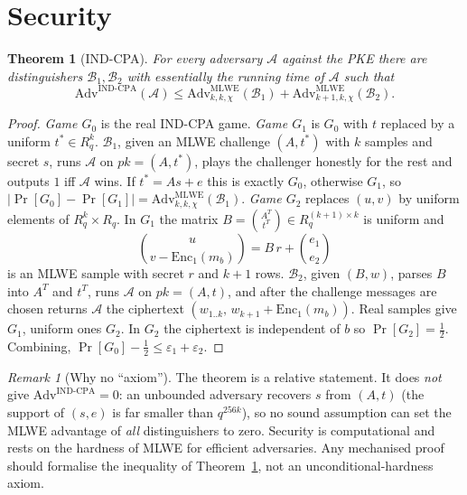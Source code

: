 \documentclass[11pt]{article}
\newtheorem{theorem}{Theorem}
\theoremstyle{remark}
\newtheorem{remark}{Remark}
\newcommand{\Rq}{R_q}
\begin{document}
\section{Security}\label{sec:sec}
\begin{theorem}[IND-CPA]\label{thm:cpa}
For every adversary $\mathcal A$ against the PKE there are distinguishers $\mathcal B_1,\mathcal B_2$ with essentially the running time of $\mathcal A$ such that
\[
\mathrm{Adv}^{\mathrm{IND\text{-}CPA}}(\mathcal A)\le \mathrm{Adv}^{\mathrm{MLWE}}_{k,k,\chi}(\mathcal B_1)+\mathrm{Adv}^{\mathrm{MLWE}}_{k+1,k,\chi}(\mathcal B_2).
\]
\end{theorem}
\begin{proof}
\emph{Game $G_0$} is the real IND-CPA game. \emph{Game $G_1$} is $G_0$ with $t$ replaced by a uniform $t^*\in\Rq^k$. $\mathcal B_1$, given an MLWE challenge $(A,t^*)$ with $k$ samples and secret $s$, runs $\mathcal A$ on $pk=(A,t^*)$, plays the challenger honestly for the rest and outputs $1$ iff $\mathcal A$ wins. If $t^*=As+e$ this is exactly $G_0$, otherwise $G_1$, so $|\Pr[G_0]-\Pr[G_1]|=\mathrm{Adv}^{\mathrm{MLWE}}_{k,k,\chi}(\mathcal B_1)$.
\emph{Game $G_2$} replaces $(u,v)$ by uniform elements of $\Rq^k\times\Rq$. In $G_1$ the matrix $B=\binom{A^{T}}{t^{T}}\in\Rq^{(k+1)\times k}$ is uniform and
\[
\binom{u}{v-\mathrm{Enc}_1(m_b)}=B\,r+\binom{e_1}{e_2}
\]
is an MLWE sample with secret $r$ and $k+1$ rows. $\mathcal B_2$, given $(B,w)$, parses $B$ into $A^{T}$ and $t^{T}$, runs $\mathcal A$ on $pk=(A,t)$, and after the challenge messages are chosen returns $\mathcal A$ the ciphertext $(w_{1..k},\,w_{k+1}+\mathrm{Enc}_1(m_b))$. Real samples give $G_1$, uniform ones $G_2$. In $G_2$ the ciphertext is independent of $b$ so $\Pr[G_2]=\tfrac12$. Combining, $\Pr[G_0]-\tfrac12\le\varepsilon_1+\varepsilon_2$.
\end{proof}
\begin{remark}[Why no ``axiom'']
The theorem is a relative statement. It does \emph{not} give $\mathrm{Adv}^{\mathrm{IND\text{-}CPA}}=0$: an unbounded adversary recovers $s$ from $(A,t)$ (the support of $(s,e)$ is far smaller than $q^{256k}$), so no sound assumption can set the MLWE advantage of \emph{all} distinguishers to zero. Security is computational and rests on the hardness of MLWE for efficient adversaries. Any mechanised proof should formalise the inequality of Theorem~\ref{thm:cpa}, not an unconditional-hardness axiom.
\end{remark}
\end{document}
